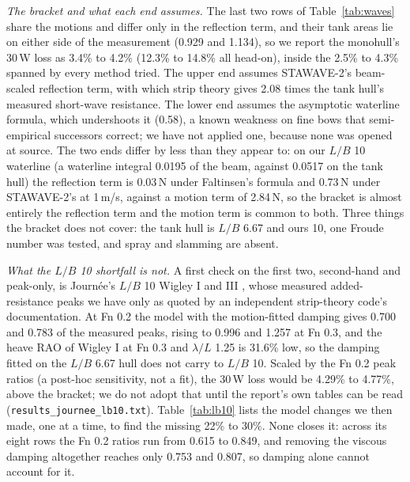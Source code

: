 \documentclass[conference]{IEEEtran}
\begin{document}
\emph{The bracket and what each end assumes.} The last two rows of Table~\ref{tab:waves} share the motions and differ only in the reflection term, and their tank areas lie on either side of the measurement (0.929 and 1.134), so we report the monohull's 30\,W loss as 3.4\% to 4.2\% (12.3\% to 14.8\% all head-on), inside the 2.5\% to 4.3\% spanned by every method tried. The upper end assumes STAWAVE-2's beam-scaled reflection term, with which strip theory gives 2.08 times the tank hull's measured short-wave resistance. The lower end assumes the asymptotic waterline formula, which undershoots it (0.58), a known weakness on fine bows that semi-empirical successors correct; we have not applied one, because none was opened at source. The two ends differ by less than they appear to: on our $L/B$ 10 waterline (a waterline integral 0.0195 of the beam, against 0.0517 on the tank hull) the reflection term is 0.03\,N under Faltinsen's formula and 0.73\,N under STAWAVE-2's at 1\,m/s, against a motion term of 2.84\,N, so the bracket is almost entirely the reflection term and the motion term is common to both. Three things the bracket does not cover: the tank hull is $L/B$ 6.67 and ours 10, one Froude number was tested, and spray and slamming are absent.

\emph{What the $L/B$ 10 shortfall is not.} A first check on the first two, second-hand and peak-only, is Journ\'ee's $L/B$ 10 Wigley I and III \cite{journee1992wigley}, whose measured added-resistance peaks we have only as quoted by an independent strip-theory code's documentation. At Fn 0.2 the model with the motion-fitted damping gives 0.700 and 0.783 of the measured peaks, rising to 0.996 and 1.257 at Fn 0.3, and the heave RAO of Wigley I at Fn 0.3 and $\lambda/L$ 1.25 is 31.6\% low, so the damping fitted on the $L/B$ 6.67 hull does not carry to $L/B$ 10. Scaled by the Fn 0.2 peak ratios (a post-hoc sensitivity, not a fit), the 30\,W loss would be 4.29\% to 4.77\%, above the bracket; we do not adopt that until the report's own tables can be read (\texttt{results\_journee\_lb10.txt}). Table~\ref{tab:lb10} lists the model changes we then made, one at a time, to find the missing 22\% to 30\%. None closes it: across its eight rows the Fn 0.2 ratios run from 0.615 to 0.849, and removing the viscous damping altogether reaches only 0.753 and 0.807, so damping alone cannot account for it.
\end{document}
